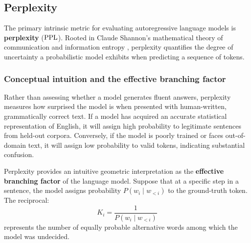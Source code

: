 \documentclass[../../main.tex]{subfiles}
\begin{document}
\subsection{Perplexity}
\label{subsec:perplexity}

The primary intrinsic metric for evaluating autoregressive language models is \textbf{perplexity} ($\mathrm{PPL}$). Rooted in Claude Shannon's mathematical theory of communication and information entropy \cite{shannon1948}, perplexity quantifies the degree of uncertainty a probabilistic model exhibits when predicting a sequence of tokens.

\subsubsection{Conceptual intuition and the effective branching factor}
Rather than assessing whether a model generates fluent answers, perplexity measures how surprised the model is when presented with human-written, grammatically correct text. If a model has acquired an accurate statistical representation of English, it will assign high probability to legitimate sentences from held-out corpora. Conversely, if the model is poorly trained or faces out-of-domain text, it will assign low probability to valid tokens, indicating substantial confusion.

Perplexity provides an intuitive geometric interpretation as the \textbf{effective branching factor} of the language model. Suppose that at a specific step in a sentence, the model assigns probability $P(w_i \mid w_{<i})$ to the ground-truth token. The reciprocal:
\begin{equation}
\label{eq:equivalent_words_def}
K_i = \frac{1}{P(w_i \mid w_{<i})}
\end{equation}
represents the number of equally probable alternative words among which the model was undecided. 
\end{document}
